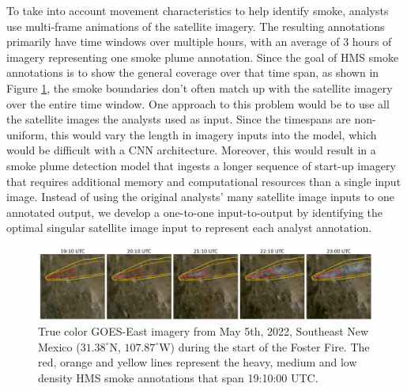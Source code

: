 \documentclass{article}
\begin{document}
To take into account movement characteristics to help identify smoke, analysts use multi-frame animations of the satellite imagery. The resulting annotations primarily have time windows over multiple hours, with an average of 3 hours of imagery representing one smoke plume annotation. Since the goal of HMS smoke annotations is to show the general coverage over that time span, as shown in Figure \ref{timelapse}, the smoke boundaries don't often match up with the satellite imagery over the entire time window. One approach to this problem would be to use all the satellite images the analysts used as input. Since the timespans are non-uniform, this would vary the length in imagery inputs into the model, which would be difficult with a CNN architecture. Moreover, this would result in a smoke plume detection model that ingests a longer sequence of start-up imagery that requires additional memory and computational resources than a single input image. Instead of using the original analysts' many satellite image inputs to one annotated output, we develop a one-to-one input-to-output by identifying the optimal singular satellite image input to represent each analyst annotation. 

\begin{figure}[!htb]
    \centering
    \includegraphics[width=\linewidth]{figures/timelapse_small.png}
    \caption{True color GOES-East imagery from May 5th, 2022, Southeast New Mexico (\(31.38^{\circ}\)N, \(107.87^{\circ}\)W) during the start of the Foster Fire. The red, orange and yellow lines represent the heavy, medium and low density HMS smoke annotations that span 19:10:00 UTC.}
    \label{timelapse}
\end{figure}
\end{document}
